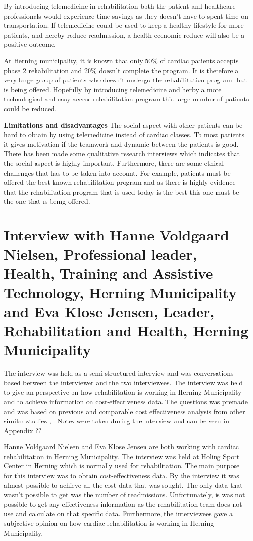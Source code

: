 By introducing telemedicine in rehabilitation both the patient and healthcare professionals would experience time savings as they doesn’t have to spent time on transportation. If telemedicine could be used to keep a healthy lifestyle for more patients, and hereby reduce readmission, a health economic reduce will also be a positive outcome. 

At Herning municipality, it is known that only 50\% of cardiac patients accepts phase 2 rehabilitation and 20\% doesn’t complete the program. It is therefore a very large group of patients who doesn’t undergo the rehabilitation program that is being offered. Hopefully by introducing telemedicine and herby a more technological and easy access rehabilitation program this large number of patients could be reduced. 

\textbf{Limitations and disadvantages} \newline
The social aspect with other patients can be hard to obtain by using telemedicine instead of cardiac classes. To most patients it gives motivation if the teamwork and dynamic between the patients is good. There has been made some qualitative research interviews which indicates that the social aspect is highly important. Furthermore, there are some ethical challenges that has to be taken into account. For example, patients must be offered the best-known rehabilitation program and as there is highly evidence that the rehabilitation program that is used today is the best this one must be the one that is being offered.  

\section{Interview with Hanne Voldgaard Nielsen, Professional leader, Health, Training and Assistive Technology, Herning Municipality and Eva Klose Jensen, Leader, Rehabilitation and Health, Herning Municipality}\label{sec: evahanne}

The interview was held as a semi structured interview and was conversations based between the interviewer and the two interviewees. The interview was held to give an perspective on how rehabilitation is working in Herning Municipality and to achieve information on cost-effectiveness data. The questions was premade and was based on previous and comparable cost effectiveness analysis from other similar studies \cite{costeffect}, \cite{usingeffect}. Notes were taken during the interview and can be seen in Appendix ??

Hanne Voldgaard Nielsen and Eva Klose Jensen are both working with cardiac rehabilitation in Herning Municipality. The interview was held at Holing Sport Center in Herning which is normally used for rehabilitation. The main purpose for this interview was to obtain cost-effectiveness data. By the interview it was almost possible to achieve all the cost data that was sought. The only data that wasn’t possible to get was the number of readmissions. Unfortunately, is was not possible to get any effectiveness information as the rehabilitation team does not use and calculate on that specific data. Furthermore, the interviewees gave a subjective opinion on how cardiac rehabilitation is working in Herning Municipality.              

